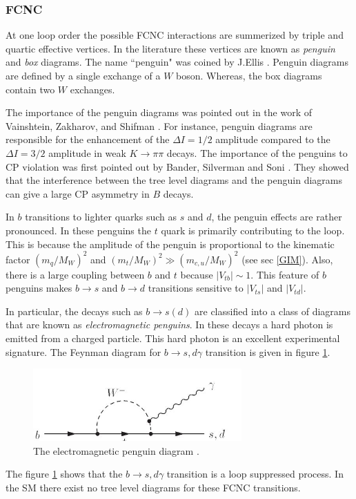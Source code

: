 \subsubsection{FCNC}\label{fcnc}
\vspace{-0.3cm}
At one loop order the possible FCNC interactions are summerized by triple and quartic effective vertices. In the literature these vertices are known as \textit{penguin} and \textit{box} diagrams. The name ``penguin" was coined by J.Ellis \cite{Ellis:1977uk}. Penguin diagrams are defined by a single exchange of a $W$ boson. Whereas, the box diagrams contain two $W$ exchanges. \par
The importance of the penguin diagrams was pointed out in the work of Vainshtein, Zakharov, and Shifman \cite{Shifman:1975tn}. For instance, penguin diagrams are responsible for the enhancement of the $\Delta I=1/2$ amplitude compared to the $\Delta I=3/2$ amplitude in weak $K\rightarrow \pi\pi$ decays. The importance of the penguins to CP violation was first pointed out by Bander, Silverman and Soni 
\cite{Bander:1979px}. They showed that the interference between the tree level diagrams and the penguin diagrams can give a large CP asymmetry in $B$ decays.\par
In $b$ transitions to lighter quarks such as $s$ and $d$, the penguin effects are rather pronounced. In these penguins the $t$ quark is primarily contributing to the loop. This is because the amplitude of the penguin is proportional to the kinematic factor $(m_q/M_W)^2$ and $(m_t/M_W)^2\gg (m_{c,u}/M_W)^2$ (see sec \ref{GIM}). Also, there is a large coupling between $b$ and $t$ because $|V_{tb}|\sim 1$. This feature of $b$ penguins makes $b\rightarrow s$ and $b\rightarrow d$ transitions sensitive to $|V_{ts}|$ and $|V_{td}|$. \par
In particular, the decays such as $b\rightarrow s (d)$ are classified into a class of diagrams that are known as \textit{electromagnetic penguins}. In these decays a hard photon is emitted from a charged particle. This hard photon is an excellent experimental signature.  The Feynman diagram for $b\rightarrow s,d \gamma$ transition is given in figure \ref{fig:Btosd_fcnc}.
\vspace*{-0.5cm}
\begin{figure}[H]
\centering
\includegraphics[width=8cm]{em_peng.JPG}
\caption{\label{fig:Btosd_fcnc}
The electromagnetic penguin diagram \cite{Lingel:1998fa}.}
\end{figure}
The figure \ref{fig:Btosd_fcnc} shows that the $b\rightarrow s,d \gamma$ transition is a loop suppressed process. In the SM there exist no tree level diagrams for these FCNC transitions. 
